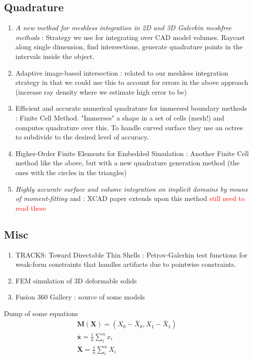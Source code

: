 \documentclass[sigconf]{acmart}
\newcommand\myworries[1]{\textcolor{red}{#1}}
\begin{document}
\subsection{Quadrature}
\begin{enumerate}
    \item \textit{A new method for meshless integration in 2D and 3D Galerkin meshfree methods} \cite{KHOSRAVIFARD201030}: Strategy we use for integrating over CAD model volumes. Raycast along single dimension, find intersections, generate quadrature points in the intervals inside the object.
    \item Adaptive image-based intersection \cite{DBLP:journals/tog/WangFP12}: related to our meshless integration strategy in that we could use this to account for errors in the above approach (increase ray density where we estimate high error to be)
    \item Efficient and accurate numerical quadrature for immersed boundary methods \cite{10.1186/s40323-015-0031-y}: Finite Cell Method. "Immerses" a shape in a set of cells (mesh!) and computes quadrature over this. To handle curved surface they use an octree to subdivide to the desired level of accuracy.
    \item Higher-Order Finite Elements for Embedded Simulation \cite{10.1145/3414685.3417853}: Another Finite Cell method like the above, but with a new quadrature generation method (the ones with the circles in the triangles)
    \item \textit{Highly accurate surface and volume integration on implicit domains by means of moment-fitting} \cite{https://doi.org/10.1002/nme.4569} and \cite{https://doi.org/10.1002/nme.5343}: XCAD paper extends upon this method \myworries{still need to read these}
\end{enumerate}

\subsection{Misc}
\begin{enumerate}
	\item TRACKS: Toward Directable Thin Shells \cite{10.1145/1276377.1276439}: Petrov-Galerkin test functions for weak-form constraints that handles artifacts due to pointwise constraints.
    \item FEM simulation of 3D deformable solids \cite{10.1145/2343483.2343501}
    \item Fusion 360 Gallery \cite{willis2020fusion} : source of some models
\end{enumerate}





Dump of some equations
\begin{align*}
    \mathbf{M(X)} = (X_0 - \bar{X}_0, X_1 - \bar{X}_1)\\
    \bar{\mathbf{x}} = \frac{1}{n}\sum_i^n x_i \\
    \bar{\mathbf{X}} = \frac{1}{n}\sum_i^n X_i \\
\end{align*}
\end{document}
